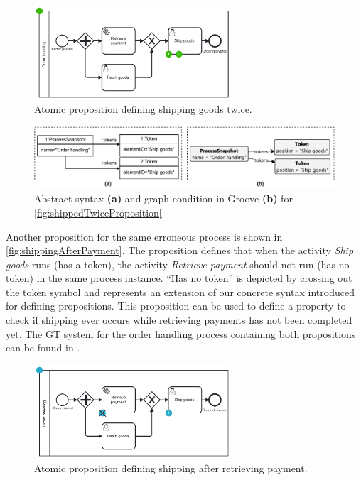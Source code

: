 \documentclass{lmcs} %
\begin{document}
\begin{figure}[ht]
    \centering
    \includegraphics[width=0.65\textwidth]{images/shippedTwiceProposition.pdf}
    \caption{Atomic proposition defining shipping goods twice.}
    \label{fig:shippedTwiceProposition}
\end{figure}

\begin{figure}[ht]
    \centering
    \includegraphics[width=1\textwidth]{images/twice.pdf}
    \caption{Abstract syntax \textbf{(a)} and graph condition in Groove \textbf{(b)} for \autoref{fig:shippedTwiceProposition}}
    \label{fig:shippedTwiceAbstractAndGroove}
\end{figure}

Another proposition for the same erroneous process is shown in \autoref{fig:shippingAfterPayment}.
The proposition defines that when the activity \textit{Ship goods} runs (has a token), the activity \textit{Retrieve payment} should not run (has no token) in the same process instance.
\enquote{Has no token} is depicted by crossing out the token symbol and represents an extension of our concrete syntax introduced for defining propositions.
This proposition can be used to define a property to check if shipping ever occurs while retrieving payments has not been completed yet.
The GT system for the order handling process containing both propositions can be found in \cite{timkrauterLMCS2024Artifacts2023}.

\begin{figure}[ht]
    \centering
    \includegraphics[width=0.65\textwidth]{images/shippingAfterPayment.pdf}
    \caption{Atomic proposition defining shipping after retrieving payment.}
    \label{fig:shippingAfterPayment}
\end{figure}
\end{document}
